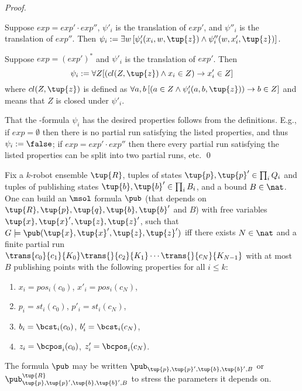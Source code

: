 \begin{proof}
\begin{itemize}
\- Suppose $exp = exp' \cdot exp''$, $\psi'_i$ is the translation of $exp'$, and $\psi''_i$ is the translation of $exp''$. Then 
$
\psi_i := \exists w \left[\psi'_i({x_i},{w},\tup{z}) \wedge \psi''_i({w},{x'_i},\tup{z})\right].
$

 \- Suppose $exp = (exp')^*$ and $\psi'_i$ is the translation of $exp'$. Then 
\[
\psi_i := \forall {Z} [(cl({Z},\tup{z}) \wedge {x_i} \in {Z}) \to {x'_i} \in {Z}]
\]
where $cl({Z},\tup{z})$ is defined as $\forall {a},{b} \left[({a} \in {Z} \wedge \psi'_i({a},{b},\tup{z})) \to {b} \in {Z}\right]$ and means that $Z$ is closed under $\psi'_i$. 
\end{itemize}

That the \msol-formula $\psi_i$ has the desired properties follows from the definitions. E.g., if $exp = \emptyset$ then there is no partial run satisfying
the listed properties, and thus $\psi_i := \false$; if $exp = exp' \cdot exp''$ then there every partial run satisfying the listed properties can be split into two partial runs, etc.
\qed
\end{proof}


\begin{lemma}
Fix a $k$-robot ensemble $\tup{R}$, tuples of states $\tup{p},\tup{p}' \in \prod_i Q_i$ and tuples of publishing states 
$\tup{b},\tup{b}' \in \prod_i B_i$, and a bound $B \in \nat$.
One can build an $\msol$ formula $\pub$ (that depends on $\tup{R},\tup{p},\tup{q},\tup{b},\tup{b}'$ and $B$) with free variables 
$\tup{x}, \tup{x}', \tup{z},\tup{z}'$, such that 
$G \models \pub(\tup{x}, \tup{x}', \tup{z},\tup{z}')$ iff there exists $N \in \nat$ and a finite partial run $\trans{c_0}{c_1}{K_0}\trans{}{c_2}{K_1} \cdots \trans{}{c_N}{K_{N-1}}$ with at most $B$ publishing points with the following properties for all $i \leq k$:
\begin{enumerate}
 \item $x_i = pos_i(c_0)$, $x'_i = pos_i(c_N)$,
 \item $p_i = st_i(c_0)$, $p'_i = st_i(c_N)$,
 \item $b_i = \bcst_i(c_0)$, $b'_i = \bcst_i(c_N)$,
 \item $z_i = \bcpos_i(c_0)$, $z'_i = \bcpos_i(c_N)$.
 \end{enumerate}
The formula $\pub$ may be written $\pub_{\tup{p},\tup{p}',\tup{b},\tup{b}',B}$ or $\pub^{\tup{R}}_{\tup{p},\tup{p}',\tup{b},\tup{b}',B}$ to stress the parameters it depends on.

\end{lemma}

